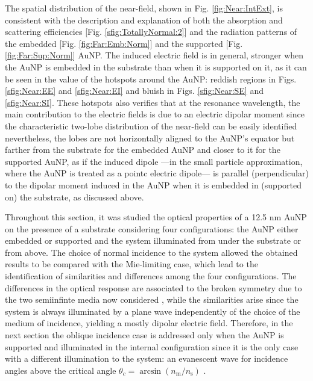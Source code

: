 The spatial distribution of the near-field, shown in Fig. \ref{fig:Near:IntExt}, is consistent with the description and explanation of both the absorption and scattering efficiencies [Fig. \ref{sfig:TotallyNormal:2}] and the radiation patterns of the embedded [Fig. \ref{fig:Far:Emb:Norm}] and the supported [Fig. \ref{fig:Far:Sup:Norm}] AuNP. The induced electric field is in general, stronger when the AuNP is embedded in the substrate than when it is supported on it, as it can be seen in the value of the hotspots around the AuNP: reddish regions in Figs. \ref{sfig:Near:EE} and \ref{sfig:Near:EI} and bluish in Figs. \ref{sfig:Near:SE} and \ref{sfig:Near:SI}. These hotspots also verifies that at the resonance wavelength, the main contribution to the electric fields is due to an electric dipolar moment since the characteristic two-lobe distribution of the near-field can be easily identified nevertheless, the lobes are not horizontally aligned to the AuNP's equator but farther from the substrate for the embedded AuNP and closer to it for the supported AuNP, as if the induced dipole ---in the small particle approximation, where the AuNP is treated as a pointc electric dipole--- is parallel (perpendicular) to the dipolar moment induced in the AuNP when it is embedded in (supported on) the substrate, as discussed above.

Throughout this section, it was studied the optical properties of a 12.5 nm AuNP on the presence of a substrate considering four configurations: the AuNP either embedded or supported and the system illuminated from under the substrate or from above. The choice of normal incidence to the system allowed the obtained results to be compared with the Mie-limiting case, which lead to the identification of similarities and differences among the four configurations. The differences in the optical response are associated to the broken symmetry due to the two semiinfinte media now considered \cite{meng_anisotropic_2015}, while the similarities arise since the system is always illuminated by a plane wave independently of the choice of the medium of incidence, yielding a mostly dipolar electric field. Therefore, in the next section the oblique incidence case is addressed only when the AuNP is supported and illuminated in the internal configuration since it is the only case with a different illumination to the system: an evanescent wave for incidence angles above the critical angle $\theta_c =\arcsin(n_\text{m}/n_\text{s})$ \cite{born_max_principle_1999}.
